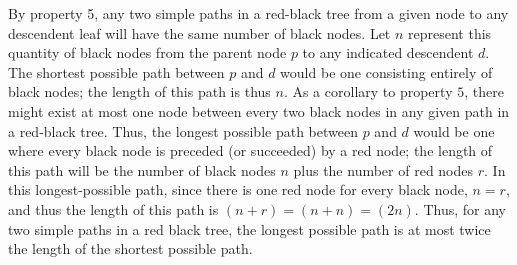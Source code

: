 By property 5, any two simple paths in a red-black tree from a given node to any descendent leaf will have the same number of black nodes. Let $ n $ represent this quantity of black nodes from the parent node $ p $ to any indicated descendent $ d $. The shortest possible path between $ p $ and $ d $ would be one consisting entirely of black nodes; the length of this path is thus $ n $. As a corollary to property $ 5 $, there might exist at most one node between every two black nodes in any given path in a red-black tree. Thus, the longest possible path between $ p $ and $ d $ would be one where every black node is preceded (or succeeded) by a red node; the length of this path will be the number of black nodes $ n $ plus the number of red nodes $ r $. In this longest-possible path, since there is one red node for every black node, $ n = r $, and thus the length of this path is $ (n + r) = (n + n) = (2n) $. Thus, for any two simple paths in a red black tree, the longest possible path is at most twice the length of the shortest possible path.